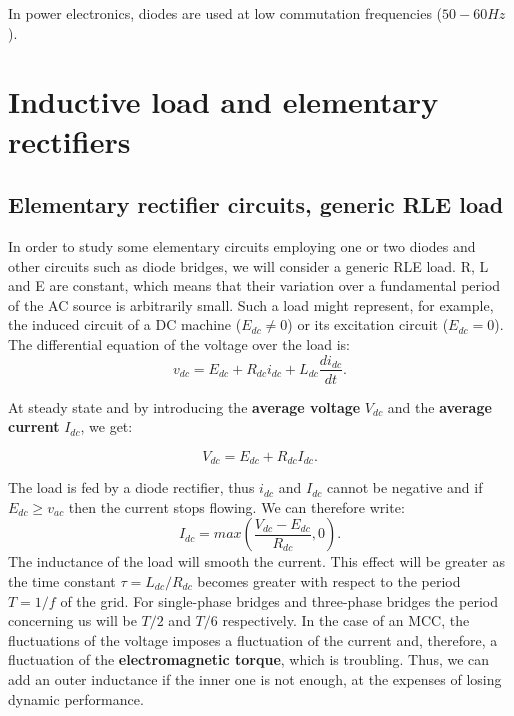         In power electronics, diodes are used at low commutation frequencies ($50 - 60 Hz$).
	
	\section{Inductive load and elementary rectifiers}
		\subsection{Elementary rectifier circuits, generic RLE load}
		In order to study some elementary circuits employing one or two diodes and other circuits such as diode bridges, we will consider a generic RLE load. R, L and E are constant, which means that their variation over a fundamental period of the AC source is arbitrarily small. Such a load might represent, for example, the induced circuit of a DC machine ($E_{dc} \neq 0$) or its excitation circuit ($E_{dc}=0$). The differential equation of the voltage over the load is:
		\begin{equation}
			v_{dc} = E_{dc} + R_{dc}i_{dc} + L_{dc}\frac{di_{dc}}{dt}.
		\end{equation}
			
		At steady state and by introducing the \textbf{average voltage} $V_{dc}$ and the \textbf{average current} $I_{dc}$, we get:
			
			\begin{equation}
				V_{dc} = E_{dc} + R_{dc} I_{dc}.
			\end{equation}
			
			The load is fed by a diode rectifier, thus $i_{dc}$ and $I_{dc}$ cannot be negative and if $E_{dc}\geq v_{ac}$ then the current stops flowing. We can therefore write:
			\begin{equation}
				I_{dc} = max\left(\frac{V_{dc} - E_{dc}}{R_{dc}}, 0\right).
			\end{equation}
			The inductance of the load will smooth the current. This effect will be greater as the time constant $\tau = L_{dc}/R_{dc}$ becomes greater with respect to the period $T=1/f$ of the grid. For single-phase bridges and three-phase bridges the period concerning us will be $T/2$ and $T/6$ respectively. In the case of an MCC, the fluctuations of the voltage imposes a fluctuation of the current and, therefore, a fluctuation of the \textbf{electromagnetic torque}, which is troubling. Thus, we can add an outer inductance if the inner one is not enough, at the expenses of losing dynamic performance. 

